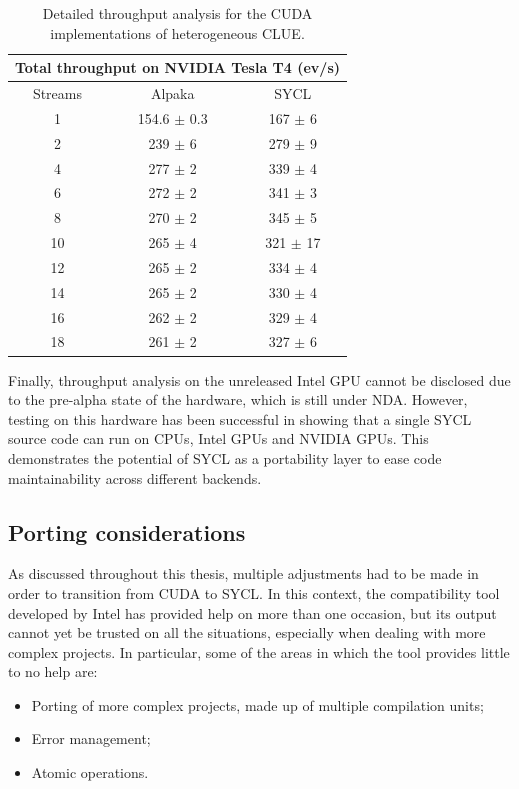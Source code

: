 \begin{table}[H]
    \centering
    \begin{tabular}{|c|c|c|}
 \hline
 \multicolumn{3}{|c|}{Total throughput on NVIDIA Tesla T4 (ev/s)} \\
 \hline
 Streams & Alpaka & SYCL\\
 \hline
 1 & 154.6 $\pm$ 0.3 & 167 $\pm$ 6 \\
 2 & 239 $\pm$ 6 & 279 $\pm$ 9 \\
 4 & 277 $\pm$ 2 &	339 $\pm$ 4 \\
 6 & 272 $\pm$ 2 & 341 $\pm$ 3 \\
 8 & 270 $\pm$ 2 & 345 $\pm$ 5 \\
 10 & 265 $\pm$	4 &	321 $\pm$ 17 \\
 12 & 265 $\pm$ 2 & 334 $\pm$ 4 \\
 14 & 265 $\pm$ 2 & 330 $\pm$ 4 \\
 16 & 262 $\pm$	2 &	329 $\pm$ 4 \\
 18 & 261 $\pm$ 2 &	327 $\pm$ 6 \\
 \hline
\end{tabular}
    \caption{Detailed throughput analysis for the CUDA implementations of heterogeneous CLUE.}
    \label{tab:hclue_cuda_performance}
\end{table}

Finally, throughput analysis on the unreleased Intel GPU cannot be disclosed due to the pre-alpha state of the hardware, which is still under NDA. However, testing on this hardware has been successful in showing that a single SYCL source code can run on CPUs, Intel GPUs and NVIDIA GPUs. This demonstrates the potential of SYCL as a portability layer to ease code maintainability across different backends.

\subsection{Porting considerations}
As discussed throughout this thesis, multiple adjustments had to be made in order to transition from CUDA to SYCL. In this context, the compatibility tool developed by Intel has provided help on more than one occasion, but its output cannot yet be trusted on all the situations, especially when dealing with more complex projects. In particular, some of the areas in which the tool provides little to no help are:
\begin{itemize}
    \item Porting of more complex projects, made up of multiple compilation units;
    \item Error management;
    \item Atomic operations.
\end{itemize}

